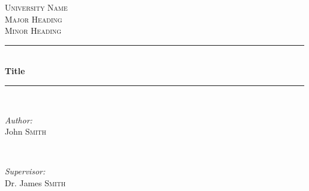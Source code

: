 	
	\begin{titlepage}
		
		\newcommand{\HRule}{\rule{\linewidth}{0.5mm}} %
		
		\center %
		
		
		\textsc{\LARGE University Name}\\[1.5cm] %
		\textsc{\Large Major Heading}\\[0.5cm] %
		\textsc{\large Minor Heading}\\[0.5cm] %
		
		
		\HRule \\[0.4cm]
		{ \huge \bfseries Title}\\[0.4cm] %
		\HRule \\[1.5cm]
		
		
		\begin{minipage}{0.4\textwidth}
			\begin{flushleft} \large
				\emph{Author:}\\
				John \textsc{Smith} %
			\end{flushleft}
		\end{minipage}
		~
		\begin{minipage}{0.4\textwidth}
			\begin{flushright} \large
				\emph{Supervisor:} \\
				Dr. James \textsc{Smith} %
			\end{flushright}
		\end{minipage}\\[2cm]
		
		

\end{titlepage}
